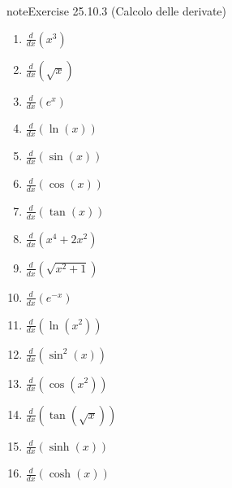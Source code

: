 \documentclass[letterpaper,10pt,italian]{jupyterBook}
\begin{document}
\begin{sphinxadmonition}{note}{Exercise 25.10.3 (Calcolo delle derivate)}


\begin{enumerate}
%
\item {} 
\sphinxAtStartPar
\(\frac{d}{dx} \left(x^3\right)\)

\item {} 
\sphinxAtStartPar
\(\frac{d}{dx} \left(\sqrt{x}\right)\)

\item {} 
\sphinxAtStartPar
\(\frac{d}{dx} \left(e^x\right)\)

\item {} 
\sphinxAtStartPar
\(\frac{d}{dx} \left(\ln(x)\right)\)

\item {} 
\sphinxAtStartPar
\(\frac{d}{dx} \left(\sin(x)\right)\)

\item {} 
\sphinxAtStartPar
\(\frac{d}{dx} \left(\cos(x)\right)\)

\item {} 
\sphinxAtStartPar
\(\frac{d}{dx} \left(\tan(x)\right)\)

\item {} 
\sphinxAtStartPar
\(\frac{d}{dx} \left(x^4 + 2x^2\right)\)

\item {} 
\sphinxAtStartPar
\(\frac{d}{dx} \left(\sqrt{x^2 + 1}\right)\)

\item {} 
\sphinxAtStartPar
\(\frac{d}{dx} \left(e^{-x}\right)\)

\item {} 
\sphinxAtStartPar
\(\frac{d}{dx} \left(\ln(x^2)\right)\)

\item {} 
\sphinxAtStartPar
\(\frac{d}{dx} \left(\sin^2(x)\right)\)

\item {} 
\sphinxAtStartPar
\(\frac{d}{dx} \left(\cos(x^2)\right)\)

\item {} 
\sphinxAtStartPar
\(\frac{d}{dx} \left(\tan(\sqrt{x})\right)\)

\item {} 
\sphinxAtStartPar
\(\frac{d}{dx} \left(\sinh(x)\right)\)

\item {} 
\sphinxAtStartPar
\(\frac{d}{dx} \left(\cosh(x)\right)\)


\end{enumerate}
\end{sphinxadmonition}
\end{document}
